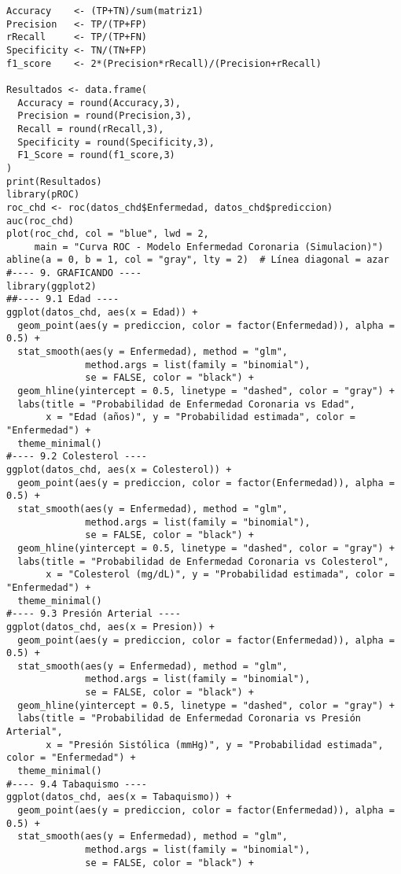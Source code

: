 \documentclass[12pt]{article}
\begin{document}
\begin{verbatim}
Accuracy    <- (TP+TN)/sum(matriz1)
Precision   <- TP/(TP+FP)
rRecall     <- TP/(TP+FN)
Specificity <- TN/(TN+FP)
f1_score    <- 2*(Precision*rRecall)/(Precision+rRecall)

Resultados <- data.frame(
  Accuracy = round(Accuracy,3),
  Precision = round(Precision,3),
  Recall = round(rRecall,3),
  Specificity = round(Specificity,3),
  F1_Score = round(f1_score,3)
)
print(Resultados)
library(pROC)
roc_chd <- roc(datos_chd$Enfermedad, datos_chd$prediccion)
auc(roc_chd)
plot(roc_chd, col = "blue", lwd = 2, 
     main = "Curva ROC - Modelo Enfermedad Coronaria (Simulacion)")
abline(a = 0, b = 1, col = "gray", lty = 2)  # Línea diagonal = azar
#---- 9. GRAFICANDO ----
library(ggplot2)
##---- 9.1 Edad ----
ggplot(datos_chd, aes(x = Edad)) +
  geom_point(aes(y = prediccion, color = factor(Enfermedad)), alpha = 0.5) +
  stat_smooth(aes(y = Enfermedad), method = "glm", 
              method.args = list(family = "binomial"), 
              se = FALSE, color = "black") +
  geom_hline(yintercept = 0.5, linetype = "dashed", color = "gray") +
  labs(title = "Probabilidad de Enfermedad Coronaria vs Edad",
       x = "Edad (años)", y = "Probabilidad estimada", color = "Enfermedad") +
  theme_minimal()
#---- 9.2 Colesterol ----
ggplot(datos_chd, aes(x = Colesterol)) +
  geom_point(aes(y = prediccion, color = factor(Enfermedad)), alpha = 0.5) +
  stat_smooth(aes(y = Enfermedad), method = "glm", 
              method.args = list(family = "binomial"), 
              se = FALSE, color = "black") +
  geom_hline(yintercept = 0.5, linetype = "dashed", color = "gray") +
  labs(title = "Probabilidad de Enfermedad Coronaria vs Colesterol",
       x = "Colesterol (mg/dL)", y = "Probabilidad estimada", color = "Enfermedad") +
  theme_minimal()
#---- 9.3 Presión Arterial ----
ggplot(datos_chd, aes(x = Presion)) +
  geom_point(aes(y = prediccion, color = factor(Enfermedad)), alpha = 0.5) +
  stat_smooth(aes(y = Enfermedad), method = "glm", 
              method.args = list(family = "binomial"), 
              se = FALSE, color = "black") +
  geom_hline(yintercept = 0.5, linetype = "dashed", color = "gray") +
  labs(title = "Probabilidad de Enfermedad Coronaria vs Presión Arterial",
       x = "Presión Sistólica (mmHg)", y = "Probabilidad estimada", color = "Enfermedad") +
  theme_minimal()
#---- 9.4 Tabaquismo ----
ggplot(datos_chd, aes(x = Tabaquismo)) +
  geom_point(aes(y = prediccion, color = factor(Enfermedad)), alpha = 0.5) +
  stat_smooth(aes(y = Enfermedad), method = "glm", 
              method.args = list(family = "binomial"), 
              se = FALSE, color = "black") +

\end{verbatim}
\end{document}

